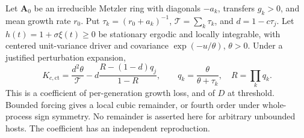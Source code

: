 \begin{lemma}\label{lem:mech-contact-ct}
Let \(\mathbf A_0\) be an irreducible Metzler ring with diagonals \(-a_k\), transfers \(g_k>0\), and mean growth rate \(r_0\). Put \(\tau_k=(r_0+a_k)^{-1}\), \(\mathcal T=\sum_k\tau_k\), and \(d=1-c\tau_j\). Let \(h(t)=1+\sigma\xi(t)\geq0\) be stationary ergodic and locally integrable, with centered unit-variance driver and covariance \(\exp(-u/\theta)\), \(\theta>0\). Under a justified perturbation expansion,
\begin{equation}\label{eq:mech-contact-ct}
 K_{c,\mathrm{ct}}=\frac{d^2\theta}{\mathcal T}
 -d\frac{R-(1-d)q_j}{1-R},\qquad
 q_k=\frac{\theta}{\theta+\tau_k},\quad R=\prod_kq_k.
\end{equation}
This is a coefficient of per-generation growth loss, and of \(D\) at threshold. Bounded forcing gives a local cubic remainder, or fourth order under whole-process sign symmetry. No remainder is asserted here for arbitrary unbounded hosts. The coefficient has an independent reproduction.
\end{lemma}
